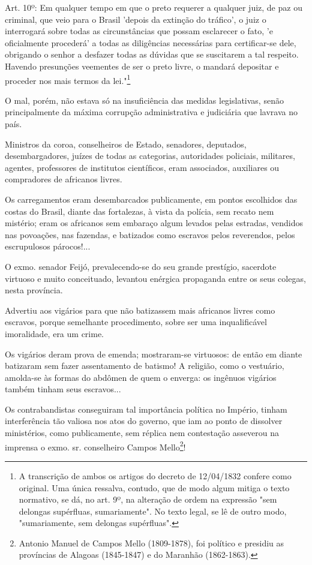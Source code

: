 Art. 10º: Em qualquer tempo em que o preto requerer a qualquer juiz, de
paz ou criminal, que veio para o Brasil 'depois da extinção do tráfico',
o juiz o interrogará sobre todas as circunstâncias que possam esclarecer
o fato, 'e oficialmente procederá' a todas as diligências necessárias
para certificar-se dele, obrigando o senhor a desfazer todas as dúvidas
que se suscitarem a tal respeito. Havendo presunções veementes de ser o
preto livre, o mandará depositar e proceder nos mais termos da
lei."\footnote{A transcrição de ambos os artigos do decreto de
  12/04/1832 confere como original. Uma única ressalva, contudo, que de
  modo algum mitiga o texto normativo, se dá, no art. 9º, na alteração
  de ordem na expressão "sem delongas supérfluas, sumariamente". No
  texto legal, se lê de outro modo, "sumariamente, sem delongas
  supérfluas".}

O mal, porém, não estava só na insuficiência das medidas legislativas,
senão principalmente da máxima corrupção administrativa e judiciária que
lavrava no país.

Ministros da coroa, conselheiros de Estado, senadores, deputados,
desembargadores, juízes de todas as categorias, autoridades policiais,
militares, agentes, professores de institutos científicos, eram
associados, auxiliares ou compradores de africanos livres.

Os carregamentos eram desembarcados publicamente, em pontos escolhidos
das costas do Brasil, diante das fortalezas, à vista da polícia, sem
recato nem mistério; eram os africanos sem embaraço algum levados pelas
estradas, vendidos nas povoações, nas fazendas, e batizados como
escravos pelos reverendos, pelos escrupulosos párocos!...

O exmo. senador Feijó, prevalecendo-se do seu grande prestígio,
sacerdote virtuoso e muito conceituado, levantou enérgica propaganda
entre os seus colegas, nesta província.

Advertiu aos vigários para que não batizassem mais africanos livres como
escravos, porque semelhante procedimento, sobre ser uma inqualificável
imoralidade, era um crime.

Os vigários deram prova de emenda; mostraram-se virtuosos: de então em
diante batizaram sem fazer assentamento de batismo! A religião, como o
vestuário, amolda-se às formas do abdômen de quem o enverga: os ingênuos
vigários também tinham seus escravos...

Os contrabandistas conseguiram tal importância política no Império,
tinham interferência tão valiosa nos atos do governo, que iam ao ponto
de dissolver ministérios, como publicamente, sem réplica nem contestação
asseverou na imprensa o exmo. sr. conselheiro Campos Mello\footnote{
  Antonio Manuel de Campos Mello (1809-1878), foi político e presidiu as
  províncias de Alagoas (1845-1847) e do Maranhão (1862-1863).}!

